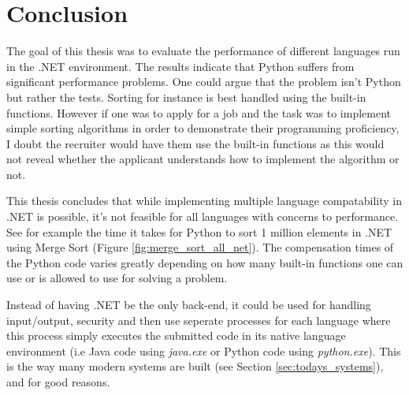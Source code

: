 \section{Conclusion}
The goal of this thesis was to evaluate the performance of different languages run in the .NET environment. The results indicate that Python suffers from significant performance problems. One could argue that the problem isn't Python but rather the tests. Sorting for instance is best handled using the built-in functions. However if one was to apply for a job and the task was to implement simple sorting algorithms in order to demonstrate their programming proficiency, I doubt the recruiter would have them use the built-in functions as this would not reveal whether the applicant understands how to implement the algorithm or not.

This thesis concludes that while implementing multiple language compatability in .NET is possible, it's not feasible for all languages with concerns to performance. See for example the time it takes for Python to sort 1 million elements in .NET using Merge Sort (Figure \ref{fig:merge_sort_all_net}). The compensation times of the Python code varies greatly depending on how many built-in functions one can use or is allowed to use for solving a problem. 

Instead of having .NET be the only back-end, it could be used for handling input/output, security and then use seperate processes for each language where this process simply executes the submitted code in its native language environment (i.e Java code using \textit{java.exe} or Python code using \textit{python.exe}). This is the way many modern systems are built (see Section \ref{sec:todays_systems}), and for good reasons.